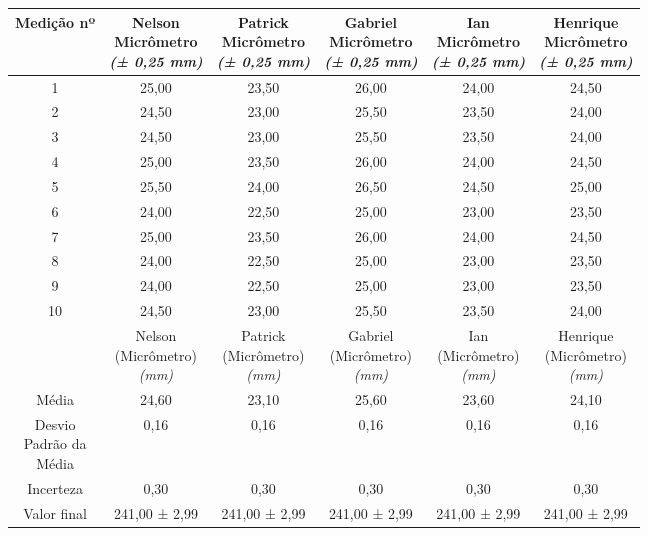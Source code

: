 \documentclass{article}
\begin{document}
\begin{table}[h!]
\centering
\begin{tabular}{c c c c c c }
\toprule
Medição nº & \shortstack{Nelson\\Micrômetro\\\textit{(± 0,25 mm)}} & \shortstack{Patrick\\Micrômetro\\\textit{(± 0,25 mm)}} & \shortstack{Gabriel\\Micrômetro\\\textit{(± 0,25 mm)}} & \shortstack{Ian\\Micrômetro\\\textit{(± 0,25 mm)}} & \shortstack{Henrique\\Micrômetro\\\textit{(± 0,25 mm)}}\\
\midrule
1 & 25,00 & 23,50 & 26,00 & 24,00 & 24,50\\
2 & 24,50 & 23,00 & 25,50 & 23,50 & 24,00\\
3 & 24,50 & 23,00 & 25,50 & 23,50 & 24,00\\
4 & 25,00 & 23,50 & 26,00 & 24,00 & 24,50\\
5 & 25,50 & 24,00 & 26,50 & 24,50 & 25,00\\
6 & 24,00 & 22,50 & 25,00 & 23,00 & 23,50\\
7 & 25,00 & 23,50 & 26,00 & 24,00 & 24,50\\
8 & 24,00 & 22,50 & 25,00 & 23,00 & 23,50\\
9 & 24,00 & 22,50 & 25,00 & 23,00 & 23,50\\
10 & 24,50 & 23,00 & 25,50 & 23,50 & 24,00\\
\midrule
&\shortstack{Nelson\\(Micrômetro)\\\textit{(mm)}} & \shortstack{Patrick\\(Micrômetro)\\\textit{(mm)}} & \shortstack{Gabriel\\(Micrômetro)\\\textit{(mm)}} & \shortstack{Ian\\(Micrômetro)\\\textit{(mm)}} & \shortstack{Henrique\\(Micrômetro)\\\textit{(mm)}}\\
\midrule
Média & 24,60 & 23,10 & 25,60 & 23,60 & 24,10\\[3pt]
\shortstack{Desvio\\Padrão da\\Média} & 0,16 & 0,16 & 0,16 & 0,16 & 0,16\\[3pt]
Incerteza & 0,30 & 0,30 & 0,30 & 0,30 & 0,30\\[3pt]
Valor final & 241,00 ± 2,99 & 241,00 ± 2,99 & 241,00 ± 2,99 & 241,00 ± 2,99 & 241,00 ± 2,99\\[3pt]
\bottomrule
\end{tabular}
\end{table}
\end{document}
